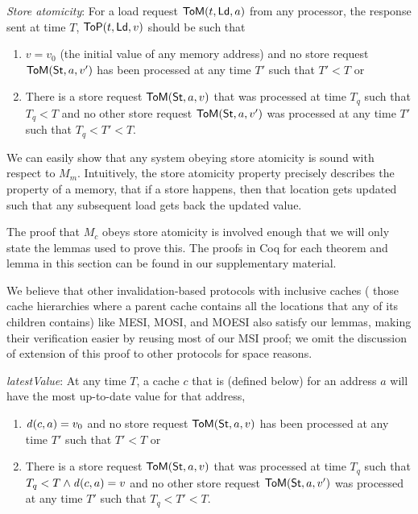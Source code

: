 \begin{defn}
\textit{Store atomicity}:
For a load request $\mathsf{ToM}(t, \mathsf{Ld}, a)$
from any processor, the response sent at time $T$,
$\mathsf{ToP}(t, \mathsf{Ld}, v)$ should be such that
\begin{enumerate}
\item $v = v_0$ (the initial value of any memory address) and no store
  request $\mathsf{ToM}(\mathsf{St}, a, v')$ has been processed at any time $T'$ such
  that $T' < T$ or
\item There is a store request $\mathsf{ToM}(\mathsf{St}, a, v)$ that was processed at time $T_q$ such that
$T_q < T$ and no other store
request $\mathsf{ToM}(\mathsf{St}, a, v')$ was processed at any time $T'$ such that $T_q < T' < T$.
\end{enumerate}
\label{sa}
\end{defn}

We can easily show that any system obeying store atomicity is sound with
respect to $M_m$. Intuitively, the store atomicity property precisely describes
the property of a memory, \viz{} that if a store happens, then that location
gets updated such that any subsequent load gets back the updated value.

The proof that $M_c$ obeys store atomicity is involved enough that we will only
state the lemmas used to prove this. The proofs in Coq for each theorem and
lemma in this section can be found in our supplementary material.

We believe that other invalidation-based protocols with inclusive caches (\ie{}
those cache hierarchies where a parent cache contains all the locations that
any of its children contains) like MESI, MOSI, and MOESI also satisfy our
lemmas, making their verification easier by reusing most of our MSI proof; we
omit the discussion of extension of this proof to other protocols for space
reasons.

\begin{lemma}
\textit{latestValue}:
At any time $T$, a cache $c$ that is \clean{} (defined below) for an address
$a$ will have the most up-to-date value for that address, \ie{}
\begin{enumerate}
\item $\mathit{d}(c,a) = v_0$ and no store request $\mathsf{ToM}(\mathsf{St}, a, v)$ has been processed at
any time $T'$ such that $T' < T$ or
\item There is a store request $\mathsf{ToM}(\mathsf{St}, a, v)$ that was processed at time $T_q$ such that
$T_q < T \wedge \mathit{d}(c,a) = v$ and no other store
request $\mathsf{ToM}(\mathsf{St}, a, v')$ was processed at any time $T'$ such that $T_q < T' < T$.
\end{enumerate}
\label{latestValue}
\end{lemma}

